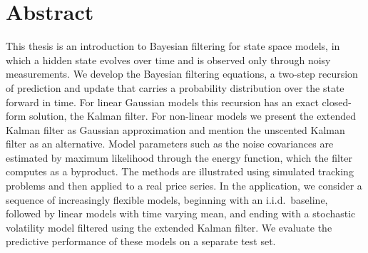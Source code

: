 \chapter*{Abstract}
This thesis is an introduction to Bayesian filtering for state space models, in which a hidden state evolves over time and is observed only through noisy measurements. We develop the Bayesian filtering equations, a two-step recursion of prediction and update that carries a probability distribution over the state forward in time. For linear Gaussian models this recursion has an exact closed-form solution, the Kalman filter. For non-linear models we present the extended Kalman filter as Gaussian approximation and mention the unscented Kalman filter as an alternative. Model parameters such as the noise covariances are estimated by maximum likelihood through the energy function, which the filter computes as a byproduct. The methods are illustrated using simulated tracking problems and then applied to a real price series. In the application, we consider a sequence of increasingly flexible models, beginning with an i.i.d.\ baseline, followed by linear models with time varying mean, and ending with a stochastic volatility model filtered using the extended Kalman filter. We evaluate the predictive performance of these models on a separate test set. 
